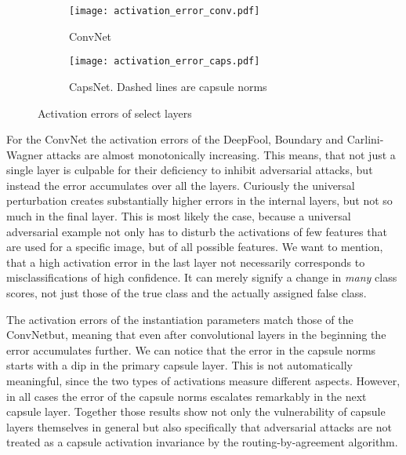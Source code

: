 \begin{figure}
	\centering
	
	\begin{subfigure}{\textwidth}
		\texttt{[image: activation\_error\_conv.pdf]}
		\caption{ConvNet}
	\end{subfigure}
	\begin{subfigure}{\textwidth}
		\texttt{[image: activation\_error\_caps.pdf]}
		\caption{CapsNet. Dashed lines are capsule norms}
	\end{subfigure}
	\caption[Activation errors]{Activation errors of select layers}
	\label{fig:activation}
\end{figure}

For the ConvNet the activation errors of the DeepFool, Boundary and Carlini-Wagner attacks are almost monotonically increasing. This means, that not just a single layer is culpable for their deficiency to inhibit adversarial attacks, but instead the error accumulates over all the layers.
Curiously the universal perturbation creates substantially higher errors in the internal layers, but not so much in the final layer.
This is most likely the case, because a universal adversarial example not only has to disturb the activations of few features that are used for a specific image, but of all possible features. 
We want to mention, that a high activation error in the last layer not necessarily corresponds to misclassifications of high confidence.
It can merely signify a change in \emph{many} class scores, not just those of the true class and the actually assigned false class.

The activation errors of the instantiation parameters match those of the ConvNetbut, meaning that even after convolutional layers in the beginning the error accumulates further.
We can notice that the error in the capsule norms starts with a dip in the primary capsule layer.
This is not automatically meaningful, since the two types of activations measure different aspects.
However, in all cases the error of the capsule norms escalates remarkably in the next capsule layer.
Together those results show not only the vulnerability of capsule layers themselves in general but also specifically that adversarial attacks are not treated as a capsule activation invariance by the routing-by-agreement algorithm.
